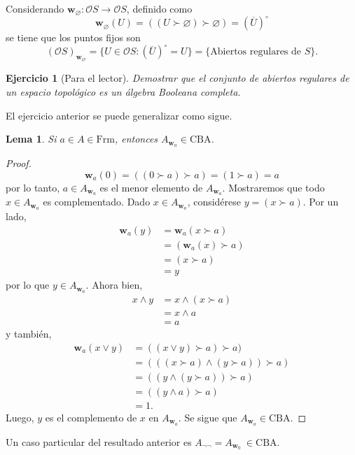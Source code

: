 \documentclass[12pt,letterpaper,titlepage]{article}
\let\emptyset\varnothing
\newtheorem{exe}{Ejercicio}
\newtheorem{lemma}{Lema}
\theoremstyle{definition}
\renewcommand\sup{\vee}
\renewcommand\inf{\wedge}
\renewcommand\cal[1]{\mathcal{#1}}
\newcommand\wnuc[1]{\mathbf w_{#1}}
\newcommand\<{\langle}
\renewcommand\>{\rangle}
\newcommand{\Frm}{\mathrm{Frm}}
\newcommand{\CBA}{\mathrm{CBA}}
\begin{document}
Considerando $\wnuc {\emptyset}:\cal O S\to \cal O S$, definido como 
$$\wnuc {\emptyset}(U)=((U\succ\emptyset)\succ\emptyset)=(\overline{U})^{\circ}$$
se tiene que los puntos fijos son 
$$(\cal OS)_{\wnuc {\emptyset}}
=\{U\in \cal O S : (\overline{U})^{\circ}=U\}
=\{\text{Abiertos regulares de }S\}.$$
\begin{exe}[Para el lector]%
Demostrar que el conjunto de abiertos regulares de un espacio topológico es un álgebra Booleana completa.
\end{exe}
El ejercicio anterior se puede generalizar como sigue.
\begin{lemma}
Si $a\in A \in \Frm$, entonces $A_{\wnuc a} \in \CBA$.
\end{lemma}
\begin{proof}
$$\wnuc a (0)=((0\succ a)\succ a)=(1\succ a)=a$$
por lo tanto, $a \in A_{\wnuc a}$ es el menor elemento de $A_{\wnuc a}$.
Mostraremos que todo $x\in A_{\wnuc a}$ es complementado.
Dado $x \in A_{\wnuc a}$, considérese $y=(x\succ a)$.
Por un lado, 
\begin{align*}
    \wnuc a(y) & =\wnuc a(x\succ a)\\
    &=(\wnuc a(x)\succ a)\\
    &=(x\succ a)\\
    &=y
\end{align*}
por lo que $y \in A_{\wnuc a}$. Ahora bien, 
\begin{align*}
    x\inf y&=x\inf(x\succ a)\\
    &=x\inf a\\
    &=a
\end{align*}
y también, 
\begin{align*}
    \wnuc a(x\sup y)&=((x\sup y)\succ a)\succ a)\\
    &=(((x\succ a)\inf(y\succ a))\succ a)\\
    &=((y\inf(y\succ a))\succ a)\\
    &=((y\inf a)\succ a)\\
    &=1.
\end{align*}
Luego, $y$ es el complemento de $x$ en $A_{\wnuc a}$.
Se sigue que $A_{\wnuc a} \in \CBA$.
\end{proof}
Un caso particular del resultado anterior es $A_{\neg \neg}=A_{\wnuc 0} \ \in \CBA$.

\end{document}
